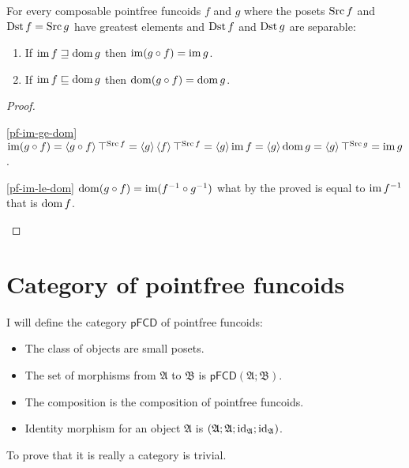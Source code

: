 \begin{prop}
For every composable pointfree funcoids $f$ and $g$ where the posets
$\operatorname{Src} f$ and $\operatorname{Dst} f=\operatorname{Src} g$ have greatest elements and $\operatorname{Dst} f$
and $\operatorname{Dst} g$ are separable:
\begin{enumerate}
\item \label{pf-im-ge-dom}If $\operatorname{im} f\sqsupseteq\operatorname{dom} g$ then $\operatorname{im}(g\circ f)=\operatorname{im} g$.
\item \label{pf-im-le-dom}If $\operatorname{im} f\sqsubseteq\operatorname{dom} g$ then $\operatorname{dom}(g\circ f)=\operatorname{dom} g$.
\end{enumerate}
\end{prop}
\begin{proof}
~
\begin{widedisorder}
\item [{\ref{pf-im-ge-dom}}] $\operatorname{im}(g\circ f)=\left\langle g\circ f\right\rangle\top^{\operatorname{Src} f}=\left\langle g\right\rangle\left\langle f\right\rangle\top^{\operatorname{Src} f}=\left\langle g\right\rangle\operatorname{im} f=\left\langle g\right\rangle\operatorname{dom} g=\left\langle g\right\rangle\top^{\operatorname{Src} g}=\operatorname{im} g$.
\item [{\ref{pf-im-le-dom}}] $\operatorname{dom}(g\circ f)=\operatorname{im}(f^{-1}\circ g^{-1})$
what by the proved is equal to $\operatorname{im} f^{-1}$ that is $\operatorname{dom} f$.
\end{widedisorder}
\end{proof}

\section{Category of pointfree funcoids}

I will define the category
$\mathsf{pFCD}$ of pointfree funcoids:
\begin{itemize}
\item The class of objects are small posets.
\item The set of morphisms from $\mathfrak{A}$ to $\mathfrak{B}$ is $\mathsf{pFCD}(\mathfrak{A};\mathfrak{B})$.
\item The composition is the composition of pointfree funcoids.
\item Identity morphism for an object $\mathfrak{A}$ is $(\mathfrak{A};\mathfrak{A};\operatorname{id}_{\mathfrak{A}};\operatorname{id}_{\mathfrak{A}})$.
\end{itemize}
To prove that it is really a category is trivial.

